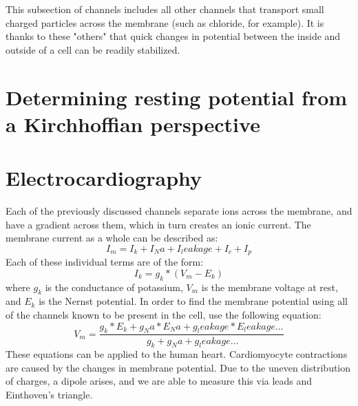 \documentclass[11pt]{book}
\begin{document}
This subsection of channels includes all other channels that transport small charged particles across the membrane (such as chloride, for example). It is thanks to these "others" that quick changes in potential between the inside and outside of a cell can be readily stabilized. 







\section{Determining resting potential from a Kirchhoffian perspective}


\section{Electrocardiography}
Each of the previously discussed channels separate ions across the membrane, and have a gradient across them, which in turn creates an ionic current. The membrane current as a whole can be described as:
\begin {equation}
	I_m = I_k + I_Na + I_leakage + I_c + I_p
\end {equation}
Each of these individual terms are of the form:
\begin {equation}
	I_k = g_k * (V_m - E_k)
\end {equation}
where $g_k$ is the conductance of potassium, $V_m$ is the membrane voltage at rest, and $E_k$ is the Nernst potential. In order to find the membrane potential using all of the channels known to be present in the cell, use the following equation:
\begin {equation}
	V_m = \frac{g_k * E_k + g_Na * E_Na + g_leakage * E_leakage...} {\ g_k + g_Na + g_leakage ...}
\end {equation}
These equations can be applied to the human heart. Cardiomyocyte contractions are caused by the changes in membrane potential. Due to the uneven distribution of charges, a dipole arises, and we are able to measure this via leads and Einthoven's triangle.
\end{document}
